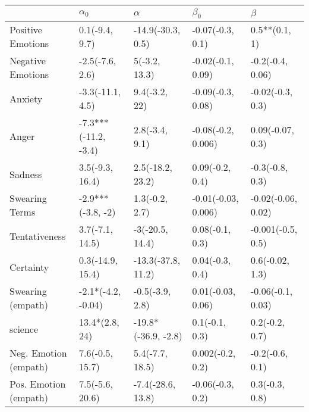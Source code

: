 \begin{tabular}{lllll}
\toprule
{} &            $\alpha_0$ &             $\alpha$ &            $\beta_0$ &             $\beta$ \\
\midrule
Positive Emotions     &        0.1(-9.4, 9.7) &    -14.9(-30.3, 0.5) &     -0.07(-0.3, 0.1) &       0.5**(0.1, 1) \\
Negative Emotions     &       -2.5(-7.6, 2.6) &        5(-3.2, 13.3) &    -0.02(-0.1, 0.09) &    -0.2(-0.4, 0.06) \\
Anxiety               &      -3.3(-11.1, 4.5) &        9.4(-3.2, 22) &    -0.09(-0.3, 0.08) &    -0.02(-0.3, 0.3) \\
Anger                 &  -7.3***(-11.2, -3.4) &       2.8(-3.4, 9.1) &   -0.08(-0.2, 0.006) &    0.09(-0.07, 0.3) \\
Sadness               &       3.5(-9.3, 16.4) &     2.5(-18.2, 23.2) &      0.09(-0.2, 0.4) &     -0.3(-0.8, 0.3) \\
Swearing Terms        &     -2.9***(-3.8, -2) &       1.3(-0.2, 2.7) &  -0.01(-0.03, 0.006) &  -0.02(-0.06, 0.02) \\
Tentativeness         &       3.7(-7.1, 14.5) &      -3(-20.5, 14.4) &      0.08(-0.1, 0.3) &   -0.001(-0.5, 0.5) \\
Certainty             &      0.3(-14.9, 15.4) &   -13.3(-37.8, 11.2) &      0.04(-0.3, 0.4) &     0.6(-0.02, 1.3) \\
Swearing (empath)     &    -2.1*(-4.2, -0.04) &      -0.5(-3.9, 2.8) &    0.01(-0.03, 0.06) &   -0.06(-0.1, 0.03) \\
science               &        13.4*(2.8, 24) &  -19.8*(-36.9, -2.8) &       0.1(-0.1, 0.3) &      0.2(-0.2, 0.7) \\
Neg. Emotion (empath) &       7.6(-0.5, 15.7) &      5.4(-7.7, 18.5) &     0.002(-0.2, 0.2) &     -0.2(-0.6, 0.1) \\
Pos. Emotion (empath) &       7.5(-5.6, 20.6) &    -7.4(-28.6, 13.8) &     -0.06(-0.3, 0.2) &      0.3(-0.3, 0.8) \\
\bottomrule
\end{tabular}
